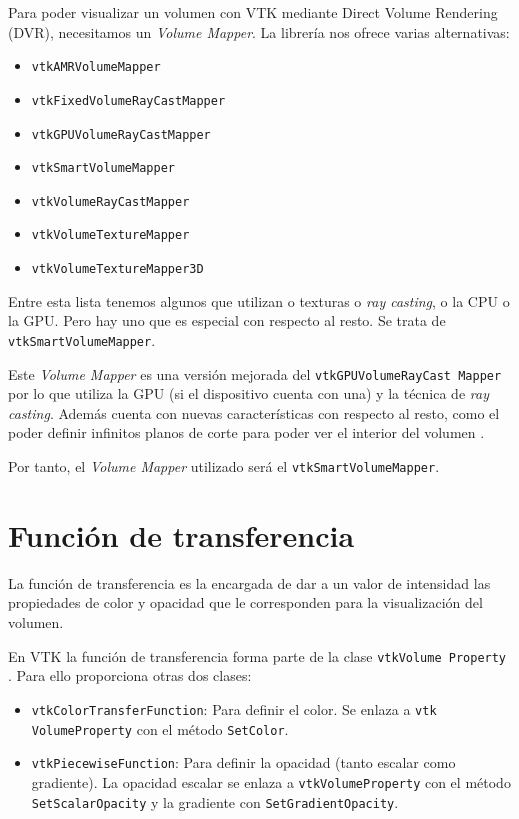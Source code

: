 Para poder visualizar un volumen con VTK mediante Direct Volume Rendering (DVR), necesitamos un \textit{Volume Mapper}. La librería nos ofrece varias alternativas:
\begin{itemize}
	\item \texttt{vtkAMRVolumeMapper}
	\item \texttt{vtkFixedVolumeRayCastMapper}
	\item \texttt{vtkGPUVolumeRayCastMapper}
	\item \texttt{vtkSmartVolumeMapper}
	\item \texttt{vtkVolumeRayCastMapper}
	\item \texttt{vtkVolumeTextureMapper}
	\item \texttt{vtkVolumeTextureMapper3D}
\end{itemize}

Entre esta lista tenemos algunos que utilizan o texturas o \textit{ray casting}, o la CPU o la GPU. Pero hay uno que es especial con respecto al resto. Se trata de \texttt{vtkSmartVolumeMapper}.

Este \textit{Volume Mapper} es una versión mejorada del \texttt{vtkGPUVolumeRayCast Mapper} por lo que utiliza la GPU (si el dispositivo cuenta con una) y la técnica de \textit{ray casting}. Además cuenta con nuevas características con respecto al resto, como el poder definir infinitos planos de corte para poder ver el interior del volumen \cite{smart_volume_mapper}.

Por tanto, el \textit{Volume Mapper} utilizado será el \texttt{vtkSmartVolumeMapper}.

\section{Función de transferencia}

La función de transferencia es la encargada de dar a un valor de intensidad las propiedades de color y opacidad que le corresponden para la visualización del volumen.

En VTK la función de transferencia forma parte de la clase \texttt{vtkVolume Property} \cite{vtk_example_medical4}. Para ello proporciona otras dos clases:
\begin{itemize}
	\item \texttt{vtkColorTransferFunction}: Para definir el color. Se enlaza a \texttt{vtk VolumeProperty} con el método \texttt{SetColor}.
	\item \texttt{vtkPiecewiseFunction}: Para definir la opacidad (tanto escalar como gradiente). La opacidad escalar se enlaza a \texttt{vtkVolumeProperty} con el método \texttt{SetScalarOpacity} y la gradiente con \texttt{SetGradientOpacity}.
\end{itemize}

